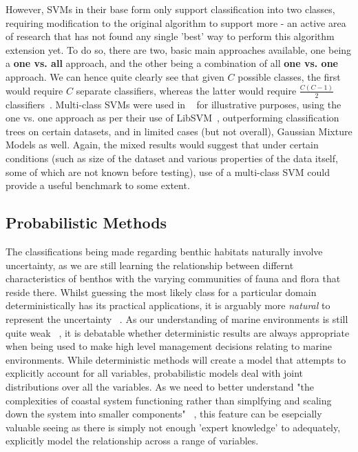However, SVMs in their base form only support classification into two classes, requiring modification to the original algorithm to support more - an active area of research that has not found any single 'best' way to perform this algorithm extension yet. To do so, there are two, basic main approaches available, one being a \textbf{one vs. all} approach, and the other being a combination of all \textbf{one vs. one} approach. We can hence quite clearly see that given $C$ possible classes, the first would require $C$ separate classifiers, whereas the latter would require $\frac{C(C-1)}{2}$ classifiers~\citep{murphy12}. Multi-class SVMs were used in ~\citet{ahsan11} for illustrative purposes, using the one vs. one approach as per their use of LibSVM~\citep{chang11}, outperforming classification trees on certain datasets, and in limited cases (but not overall), Gaussian Mixture Models as well. Again, the mixed results would suggest that under certain conditions (such as size of the dataset and various properties of the data itself, some of which are not known before testing), use of a multi-class SVM could provide a useful benchmark to some extent.

\subsection{Probabilistic Methods}
The classifications being made regarding benthic habitats naturally involve uncertainty, as we are still learning the relationship between differnt characteristics of benthos with the varying communities of fauna and flora that reside there. Whilst guessing the most likely class for a particular domain deterministically has its practical applications, it is arguably more \textit{natural} to represent the uncertainty ~\citep{rasmussen06}. As our understanding of marine environments is still quite weak ~\citep{un04}, it is debatable whether deterministic results are always appropriate when being used to make high level management decisions relating to marine environments. While deterministic methods will create a model that attempts to explicitly account for all variables, probabilistic models deal with joint distributions over all the variables. As we need to better understand "the complexities of coastal system functioning rather than simplfying and scaling down the system into smaller components" ~\citep{diaz04}, this feature can be esepcially valuable seeing as there is simply not enough 'expert knowledge' to adequately, explicitly model the relationship across a range of variables.

